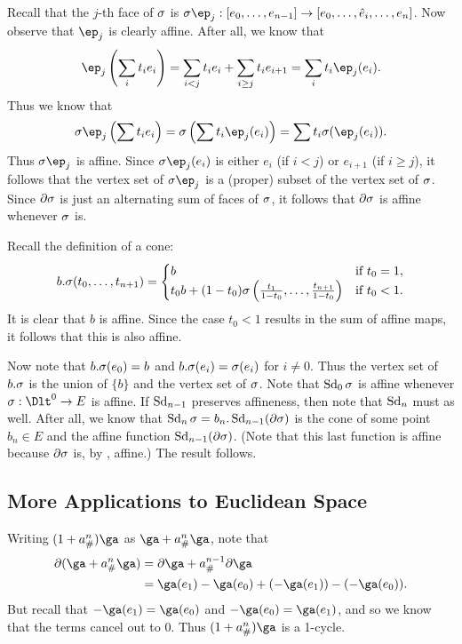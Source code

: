 \documentclass[../../solutions.tex]{subfiles}
\begin{document}
\begin{exercise} \leavevmode
Recall that the $j$-th face of $\sigma$ is $\sig\ep_j:[e_0,\dots,e_{n-1}]\to[e_0,\dots,\hat e_i,\dots,e_n]$.
Now observe that $\ep_j$ is clearly affine.
After all, we know that
\[\ep_j\left(\sum_it_ie_i\right)=\sum_{i<j}t_ie_i+\sum_{i\ge j}t_ie_{i+1}=\sum_it_i\ep_j(e_i).\]
Thus we know that
\[\sig\ep_j\left(\sum t_ie_i\right)=\sig\left(\sum t_i\ep_j(e_i)\right)=\sum t_i\sig(\ep_j(e_i)).\]
Thus $\sig\ep_j$ is affine.
Since $\sig\ep_j(e_i)$ is either $e_i$ (if $i<j$) or $e_{i+1}$ (if $i\ge j$), it follows that the vertex set of $\sig\ep_j$ is a (proper) subset of the vertex set of $\sigma$.
Since $\partial\sigma$ is just an alternating sum of faces of $\sigma$, it follows that $\partial\sigma$ is affine whenever $\sigma$ is.
\end{exercise}

\begin{exercise} \leavevmode
Recall the definition of a cone:
\[b.\sigma(t_0,\dots,t_{n+1})=
\begin{cases}
b&\text{if}~t_0=1,\\
t_0b+(1-t_0)\sigma\left(\frac{t_1}{1-t_0},\dots,\frac{t_{n+1}}{1-t_0}\right)&\text{if}~t_0<1.
\end{cases}\]
It is clear that $b$ is affine.
Since the case $t_0<1$ results in the sum of affine maps, it follows that this is also affine.

Now note that $b.\sigma(e_0)=b$ and $b.\sigma(e_i)=\sigma(e_i)$ for $i\ne0$.
Thus the vertex set of $b.\sigma$ is the union of $\{b\}$ and the vertex set of $\sigma$.
Note that $\operatorname{Sd}_0\sigma$ is affine whenever $\sig:\Dlt^0\to E$ is affine.
If $\operatorname{Sd}_{n-1}$ preserves affineness, then note that $\operatorname{Sd}_n$ must as well.
After all, we know that $\operatorname{Sd}_n\sigma=b_n.\operatorname{Sd}_{n-1}(\partial\sigma)$ is the cone of some point $b_n\in E$ and the affine function $\operatorname{Sd}_{n-1}(\partial\sigma)$.
(Note that this last function is affine because $\partial\sigma$ is, by , affine.)
The result follows.
\end{exercise}


\subsection{More Applications to Euclidean Space}
\begin{exercise} \leavevmode
Writing $(1+a^n_\#)\ga$ as $\ga+a^n_\#\ga$, note that
\begin{align*}
\partial(\ga+a^n_\#\ga) &= \partial\ga + a^{n-1}_\#\partial\ga \\
&= \ga(e_1) - \ga(e_0) + (-\ga(e_1)) - (-\ga(e_0)).
\end{align*}
But recall that $-\ga(e_1)=\ga(e_0)$ and $-\ga(e_0)=\ga(e_1)$, and so we know that the terms cancel out to 0.
Thus $(1+a^n_\#)\ga$ is a 1-cycle.
\end{exercise}
\end{document}
